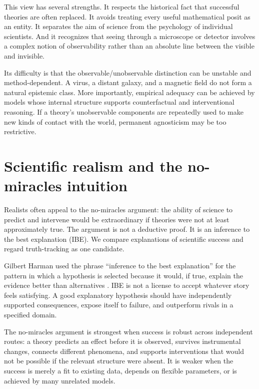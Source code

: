 This view has several strengths. It respects the historical fact that
successful theories are often replaced. It avoids treating every useful
mathematical posit as an entity. It separates the aim of science from the
psychology of individual scientists. And it recognizes that seeing through a
microscope or detector involves a complex notion of observability rather than
an absolute line between the visible and invisible.

Its difficulty is that the observable/unobservable distinction can be unstable
and method-dependent. A virus, a distant galaxy, and a magnetic field do not
form a natural epistemic class. More importantly, empirical adequacy can be
achieved by models whose internal structure supports counterfactual and
interventional reasoning. If a theory's unobservable components are repeatedly
used to make new kinds of contact with the world, permanent agnosticism may be
too restrictive.

\section{Scientific realism and the no-miracles intuition}

Realists often appeal to the no-miracles argument: the ability of science to
predict and intervene would be extraordinary if theories were not at least
approximately true. The argument is not a deductive proof. It is an inference
to the best explanation (IBE). We
compare explanations of scientific success and regard truth-tracking as one
candidate.

Gilbert Harman used the phrase \enquote{inference to the best explanation} for
the pattern in which a hypothesis is selected because it would, if true,
explain the evidence better than alternatives \citep{harman1965}. IBE is not a
license to accept whatever story feels satisfying. A good explanatory
hypothesis should have independently supported consequences, expose itself to
failure, and outperform rivals in a specified domain.

The no-miracles argument is strongest when success is robust across
independent routes: a theory predicts an effect before it is observed, survives
instrumental changes, connects different phenomena, and supports interventions
that would not be possible if the relevant structure were absent. It is weaker
when the success is merely a fit to existing data, depends on flexible
parameters, or is achieved by many unrelated models.

